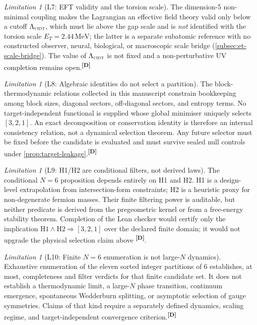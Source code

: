 \documentclass[12pt,a4paper,twoside]{article}
\theoremstyle{plain}
\theoremstyle{definition}
\theoremstyle{remark}
\newtheorem{limitation}[theorem]{Limitation}
\newcommand{\UIDT}{\textsc{uidt}} %
\newcommand{\MeV}{\,\mathrm{MeV}}
\newcommand{\catmark}[1]{\textsuperscript{\textsf{\textbf{[#1]}}}}
\newcommand{\ETorsion}{2.44\MeV} %
\begin{document}
\begin{limitation}[L7: EFT validity and the torsion scale]
\label{lim:L7}
The dimension-5 non-minimal coupling makes the Lagrangian an effective
field theory valid only below a cutoff $\Lambda_{\UIDT}$, which must lie
above the gap scale and is \emph{not} identified with the torsion scale
$E_T = \ETorsion$; the latter is a separate subatomic reference with no
constructed observer, neural, biological, or macroscopic scale bridge
(\cref{subsec:et-scale-bridge}). The value of $\Lambda_{\UIDT}$
is not fixed and a non-perturbative UV completion remains
open.\catmark{D}
\end{limitation}

\begin{limitation}[L8: Algebraic identities do not select a partition]
\label{lim:L8}
The block-thermodynamic relations collected in this manuscript constrain
bookkeeping among block sizes, diagonal sectors, off-diagonal sectors,
and entropy terms. No target-independent functional is supplied whose
global minimiser uniquely selects $[3,2,1]$. An exact decomposition or
conservation identity is therefore an internal consistency relation, not
a dynamical selection theorem. Any future selector must be fixed before
the candidate is evaluated and must survive sealed null controls under
\cref{prop:target-leakage}.\catmark{D}
\end{limitation}

\begin{limitation}[L9: H1/H2 are conditional filters, not derived laws]
\label{lim:L9}
The conditional $N=6$ proposition depends entirely on H1 and H2.
H1 is a design-level extrapolation from intersection-form constraints;
H2 is a heuristic proxy for non-degenerate fermion masses. Their finite
filtering power is auditable, but neither predicate is derived from the
pregeometric kernel or from a free-energy stability theorem. Completion
of the Lean checker would certify only the implication
$\mathrm{H1}\wedge\mathrm{H2}\Rightarrow[3,2,1]$ over the declared finite
domain; it would not upgrade the physical selection claim above
\catmark{D}.
\end{limitation}

\begin{limitation}[L10: Finite $N=6$ enumeration is not large-$N$ dynamics]
\label{lim:L10}
Exhaustive enumeration of the eleven sorted integer partitions of $6$
establishes, at most, completeness and filter verdicts for that finite
candidate set. It does not establish a thermodynamic limit, a
large-$N$ phase transition, continuum emergence, spontaneous
Wedderburn splitting, or asymptotic selection of gauge symmetries.
Claims of that kind require a separately defined dynamics, scaling
regime, and target-independent convergence criterion.\catmark{D}
\end{limitation}
\end{document}
